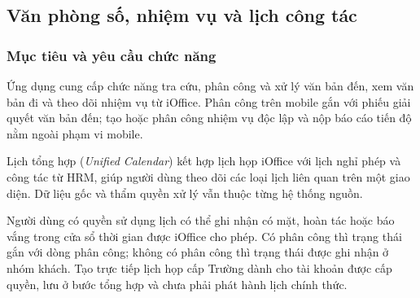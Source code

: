 \subsection{Văn phòng số, nhiệm vụ và lịch công tác}
\label{subsec:module_ioffice}
\label{subsec:req_ioffice}
\label{subsec:req_schedule}

\subsubsection{Mục tiêu và yêu cầu chức năng}

Ứng dụng cung cấp chức năng tra cứu, phân công và xử lý văn bản đến, xem văn bản đi và theo dõi nhiệm vụ từ iOffice. Phân công trên mobile gắn với phiếu giải quyết văn bản đến; tạo hoặc phân công nhiệm vụ độc lập và nộp báo cáo tiến độ nằm ngoài phạm vi mobile.

Lịch tổng hợp (\textit{Unified Calendar}) kết hợp lịch họp iOffice với lịch nghỉ phép và công tác từ HRM, giúp người dùng theo dõi các loại lịch liên quan trên một giao diện. Dữ liệu gốc và thẩm quyền xử lý vẫn thuộc từng hệ thống nguồn.

Người dùng có quyền sử dụng lịch có thể ghi nhận có mặt, hoàn tác hoặc báo vắng trong cửa sổ thời gian được iOffice cho phép. Có phân công thì trạng thái gắn với dòng phân công; không có phân công thì trạng thái được ghi nhận ở nhóm khách. Tạo trực tiếp lịch họp cấp Trường dành cho tài khoản được cấp quyền, lưu ở bước tổng hợp và chưa phải phát hành lịch chính thức.

